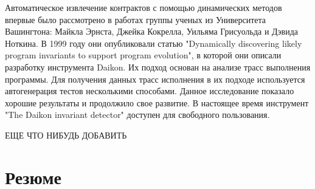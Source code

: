Автоматическое извлечение контрактов с помощью динамических методов впервые было рассмотрено в работах группы ученых из Университета Вашингтона: Майкла Эрнста, Джейка Кокрелла, Уильяма Грисуольда и Дэвида Ноткина. В 1999 году они опубликовали статью "Dynamically discovering likely program invariants to support program evolution", в которой они описали разработку инструмента Daikon\cite{discoveringInvariants}. Их подход основан на анализе трасс выполнения программы. Для получения данных трасс исполнения в их подходе используется автогенерация тестов несколькими способами. Данное исследование показало хорошие результаты и продолжило свое развитие. В настоящее время инструмент "The Daikon invariant detector" доступен для свободного пользования\cite{daikon}.

ЕЩЕ ЧТО НИБУДЬ ДОБАВИТЬ

\section{Резюме}
